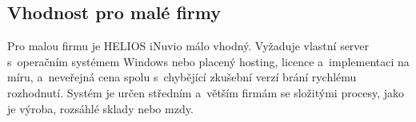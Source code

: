 \subsection{Vhodnost pro malé firmy}

Pro malou firmu je HELIOS iNuvio málo vhodný. Vyžaduje vlastní server s~operačním systémem Windows nebo placený hosting, licence a~implementaci na míru, a~neveřejná cena spolu s~chybějící zkušební verzí brání rychlému rozhodnutí. Systém je určen středním a~větším firmám se složitými procesy, jako je výroba, rozsáhlé sklady nebo mzdy.
